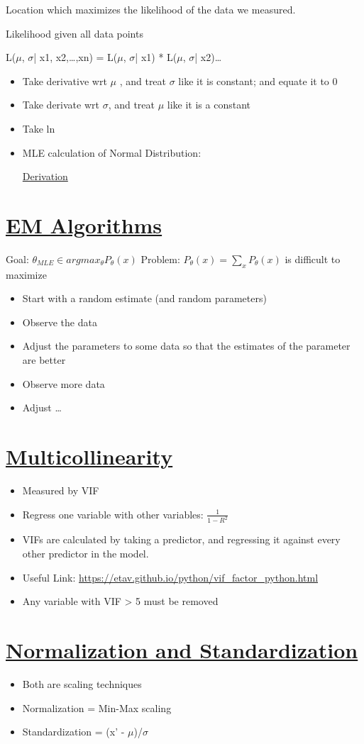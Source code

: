 \documentclass[11pt]{article}
\begin{document}
Location which maximizes the likelihood of the data we measured.


Likelihood given all data points

L(\(\mu\), \(\sigma\)| x1, x2,\ldots{},xn) =  L(\(\mu\), \(\sigma\)| x1) *  L(\(\mu\), \(\sigma\)| x2)\ldots{}

\begin{itemize}
\item Take derivative wrt \(\mu\) , and treat \(\sigma\) like it is constant; and equate it to 0
\item Take derivate wrt \(\sigma\), and treat \(\mu\) like it is a constant
\item Take ln
\item MLE calculation of Normal Distribution:

\href{./mle-normal-dist.pdf}{Derivation}
\end{itemize}

\section{\underline{EM Algorithms}}
\label{sec:org3ae73a2}

Goal: \(\theta_{MLE} \in argmax_{\theta}P_{\theta}(x)\)
Problem: \(P_{\theta}(x) = \sum_{x} P_{\theta}(x)\) is difficult to maximize

\begin{itemize}
\item Start with a random estimate (and random parameters)
\item Observe the data
\item Adjust the parameters to some data so that the estimates of the parameter are better
\item Observe more data
\item Adjust \ldots{}
\end{itemize}

\section{\underline{Multicollinearity}}
\label{sec:org2697519}

\begin{itemize}
\item Measured by VIF
\item Regress one variable with other variables: \(\frac{1}{1-R^{2}}\)
\item VIFs are calculated by taking a predictor, and regressing it against every other predictor in the model.
\item Useful Link: \url{https://etav.github.io/python/vif\_factor\_python.html}
\item Any variable with VIF > 5 must be removed
\end{itemize}


\section{\underline{Normalization and Standardization}}
\label{sec:org2c1770b}

\begin{itemize}
\item Both are scaling techniques
\item Normalization = Min-Max scaling
\item Standardization = (x' - \(\mu\))/\(\sigma\)
\end{itemize}
\end{document}
